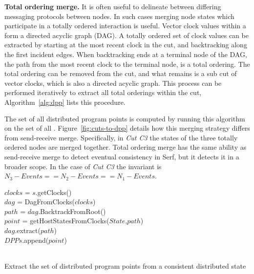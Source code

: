\textbf{Total ordering merge.} It is often useful to delineate between differing
messaging protocols between nodes. In such cases merging node states which
participate in a totally ordered interaction is useful. Vector clock values
within a \scc form a directed acyclic graph (DAG). A totally ordered
set of clock values can be extracted by starting at the most recent clock in
the cut, and backtracking along the first incident edges. When backtracking
ends at a terminal node of the DAG, the path from the most recent clock to the
terminal node, is a total ordering. The total ordering can be removed from the
cut, and what remains is a sub cut of vector clocks, which is also a directed
acyclic graph. This process can be performed iteratively to extract all total
orderings within the cut, Algorithm~\ref{alg:dpp} lists this procedure.

The set of all distributed program points is computed by running this
algorithm on the set of all .
Figure~\ref{fig:cuts-to-dpp} details how this merging strategy differs
from send-receive merge.  Specifically, in \textit{Cut C3} the states of
the three totally ordered nodes are merged together. Total ordering
merge has the same ability as send-receive merge to detect eventual
consistency in Serf, but it detects it in a broader scope.  In the
case of \textit{Cut C3} the invariant is $N_3-Events == N_2-Events ==
N_1-Events$.

\begin{algorithm}
 
 $clocks$ = $s$.getClocks()\\
 $dag$ = DagFromClocks($clocks$)\\
  {
     $path$ = $dag$.BacktrackFromRoot()\\
     $point$ = getHostStatesFromClocks($State$,$path$)\\
     $dag$.extract($path$)\\
     $DPPs$.append($point$)\\
 }
  \\
 \vspace{2mm}
 \caption{Extract the set of distributed program points from a consistent distributed state}

 \label{alg:dpp}
\end{algorithm}


